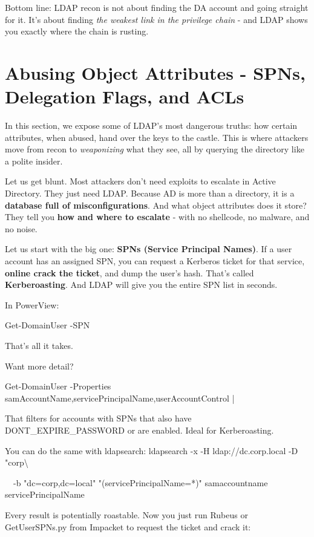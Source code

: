 Bottom line: LDAP recon is not about finding the DA account and going straight for it. It’s about finding \textit{the weakest link in the privilege chain} - and LDAP shows you exactly where the chain is rusting.

\section{\textbf{Abusing Object Attributes - SPNs, Delegation Flags, and ACLs}}

In this section, we expose some of LDAP's most dangerous truths: how certain attributes, when abused, hand over the keys to the castle. This is where attackers move from recon to \textit{weaponizing} what they see, all by querying the directory like a polite insider.

Let us get blunt. Most attackers don’t need exploits to escalate in Active Directory. They just need LDAP. Because AD is more than a directory, it is a \textbf{ database full of misconfigurations}. And what object attributes does it store? They tell you \textbf{how and where to escalate} - with no shellcode, no malware, and no noise.

Let us start with the big one: \textbf{SPNs (Service Principal Names)}. If a user account has an assigned SPN, you can request a Kerberos ticket for that service, \textbf{ online crack the ticket}, and dump the user’s hash. That’s called \textbf{Kerberoasting}. And LDAP will give you the entire SPN list in seconds.

In PowerView:

Get-DomainUser -SPN

That’s all it takes.

Want more detail?

Get-DomainUser -Properties samAccountName,servicePrincipalName,userAccountControl |


That filters for accounts with SPNs that also have DONT\_EXPIRE\_PASSWORD or are enabled. Ideal for Kerberoasting.

You can do the same with ldapsearch:
ldapsearch -x -H ldap://dc.corp.local -D "corp\textbackslash{}%

  -b "dc=corp,dc=local" "(servicePrincipalName=*)" samaccountname servicePrincipalName

Every result is potentially roastable. Now you just run Rubeus or GetUserSPNs.py from Impacket to request the ticket and crack it:

